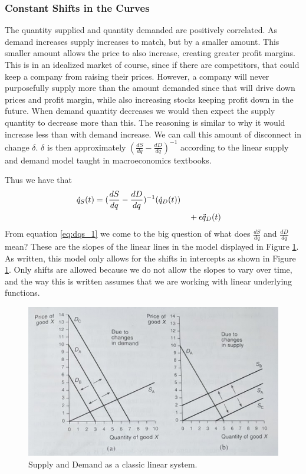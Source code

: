 \documentclass{article}
\begin{document}
\subsubsection{Constant Shifts in the Curves}
The quantity supplied and quantity demanded are positively correlated. As demand increases supply increases to match, but by a smaller amount. This smaller amount allows the price to also increase, creating greater profit margins. This is in an idealized market of course, since if there are competitors, that could keep a company from raising their prices. However, a company will never purposefully supply more than the amount demanded since that will drive down prices and profit margin, while also increasing stocks keeping profit down in the future. When demand quantity decreases we would then expect the supply quantity to decrease more than this. The reasoning is similar to why it would increase less than with demand increase. We can call this amount of disconnect in change $\delta$. $\delta$ is then approximately $(\frac{dS}{dq} - \frac{dD}{dq})^{-1}$ according to the linear supply and demand model taught in macroeconomics textbooks.

Thus we have that 
\begin{align}
	\dot{q}_S(t) = (\frac{dS}{dq} - \frac{dD}{dq})^{-1}(\dot{q}_D(t)) \label{eq:dqs_1}\\
	& \ \ \ +\epsilon\ddot{q}_D(t)  \label{eq:predict_demand}
\end{align}
From equation \eqref{eq:dqs_1} we come to the big question of what does $\frac{dS}{dq}$ and $\frac{dD}{dq}$ mean? These are the slopes of the linear lines in the model displayed in Figure \ref{fig:SnD}. As written, this model only allows for the shifts in intercepts as shown in Figure \ref{fig:SnD}. Only shifts are allowed because we do not allow the slopes to vary over time, and the way this is written assumes that we are working with linear underlying functions.   

\begin{figure}
	\centering
		\includegraphics[width = 0.6\columnwidth]{Figures/SnD.png}
	\caption{Supply and Demand as a classic linear system.}
	\label{fig:SnD} 
\end{figure}
\end{document}
